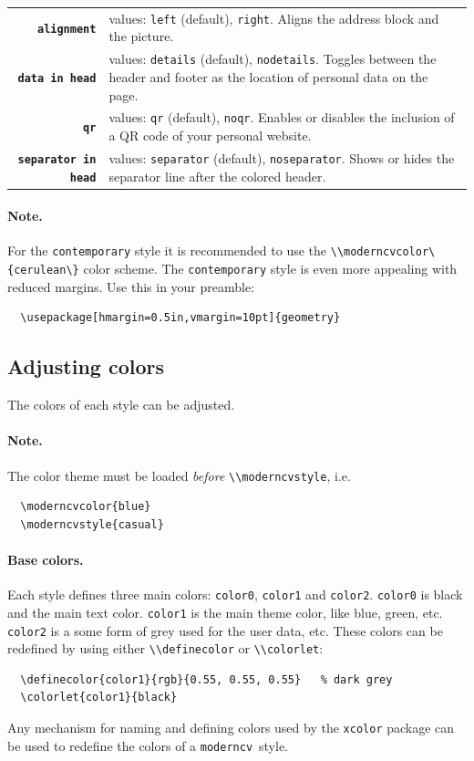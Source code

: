 \documentclass[a4paper, 11pt]{article}
\newcommand{\note}{\paragraph{Note.}}
\newcommand{\code}[1]{\lstinline!#1!}
\newcommand{\moderncv}{\code{moderncv}}
\newcommand{\Moderncv}{\moderncv~}
\begin{document}
\begin{tabular}{r@{\hspace{2ex}}p{}}
  \textbf{\code{alignment}}    & values: \code{left} (default), \code{right}.
  Aligns the address block and the picture. \\
  \textbf{\code{data in head}} & values: \code{details} (default), \code{nodetails}.
  Toggles between the header and footer as the location of personal data on the page. \\
  \textbf{\code{qr}}      & values: \code{qr} (default), \code{noqr}.
  Enables or disables the inclusion of a QR code of your personal website. \\
  \textbf{\code{separator in head}}      & values: \code{separator} (default), \code{noseparator}.
  Shows or hides the separator line after the colored header.
\end{tabular}
\note For the \code{contemporary} style it is recommended to use the \code{\\moderncvcolor\{cerulean\}} color scheme. The \code{contemporary} style is even more appealing with reduced margins. Use this in your preamble:
\begin{lstlisting}
  \usepackage[hmargin=0.5in,vmargin=10pt]{geometry}
\end{lstlisting}

\subsection{Adjusting colors}
The colors of each style can be adjusted.

\note The color theme must be loaded \emph{before} \code{\\moderncvstyle}, i.e.
\begin{lstlisting}
  \moderncvcolor{blue}
  \moderncvstyle{casual}
\end{lstlisting}

\paragraph{Base colors.}
Each style defines three main colors: \code{color0}, \code{color1} and \code{color2}.
\code{color0} is black and the main text color.
\code{color1} is the main theme color, like blue, green, etc.
\code{color2} is a some form of grey used for the user data, etc.
These colors can be redefined by using either \code{\\definecolor} or \code{\\colorlet}:
\begin{lstlisting}
  \definecolor{color1}{rgb}{0.55, 0.55, 0.55}   % dark grey
  \colorlet{color1}{black}
\end{lstlisting}
Any mechanism for naming and defining colors used by the \code{xcolor} package can be used to redefine the colors of a \Moderncv style.
\end{document}
